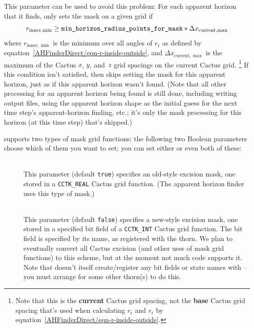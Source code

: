 \begin{description}
	This parameter can be used to avoid this problem:
	For each apparent horizon that it finds, 
	only sets the mask on a given grid if
	\begin{equation}
	r_{\text{inner},\min} \ge \verb|min_horizon_radius_points_for_mask|
		     * {\Delta x}_{\text{current},\max}
	\end{equation}
	where $r_{\text{inner},\min}$ is the minimum over all angles
	of $r_{\text{r}}$ as defined by
	equation~\eqref{AHFinderDirect/eqn-r-inside-outside},
	and ${\Delta x}_{\text{current},\max}$ is the maximum of the
	Cactus $x$, $y$, and~$z$ grid spacings on the current Cactus
	grid.%
\footnote{%
	 Note that this is the {\bf current\/} Cactus
	 grid spacing, not the {\bf base\/} Cactus grid
	 spacing that's used when calculating
	 $r_{\text{r}}$ and $r_{\text{r}}$ by
	 equation~\eqref{AHFinderDirect/eqn-r-inside-outside}.
	 }%
{}	If this condition isn't satisfied, then 
	skips setting the mask for this apparent horizon, just as if
	this apparent horizon wasn't found.  (Note that all other
	processing for an apparent horizon being found is still done,
	including writing output files, using the apparent horizon shape
	as the initial guess for the next time step's apparent-horizon
	finding, etc.; it's only the mask processing for this horizon
	(at this time step) that's skipped.)
\end{description}

 supports two types of mask grid functions;
the following two Boolean parameters choose which of them you want
to set; you can set either or even both of these:
\begin{description}
\item[]
\mbox{}\\
	This parameter (default \verb|true|) specifies an
	old-style excision mask, one stored in a \verb|CCTK_REAL|
	Cactus grid function.  (The  apparent horizon
	finder uses this type of mask.)

\item[]
\mbox{}\\
	This parameter (default \verb|false|) specifies a
	new-style excision mask, one stored in a specified bit field
	of a \verb|CCTK_INT| Cactus grid function.
	The bit field is specified by its name,
	as registered with the  thorn.
	We plan to eventually convert all Cactus excision
	(and other uses of mask grid functions) to this scheme,
	but at the moment not much code supports it.
	Note that  doesn't itself create/register
	any bit fields or state names with  --
	you must arrange for some other thorn(s) to do this.
\end{description}

